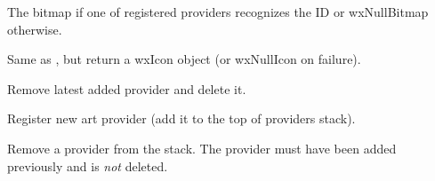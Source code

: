 The bitmap if one of registered providers recognizes the ID or wxNullBitmap otherwise.

\label{wxartprovidergeticon}


Same as , but
return a wxIcon object (or wxNullIcon on failure).

\label{wxartproviderctor}


Remove latest added provider and delete it.

\label{wxartproviderpushprovider}


Register new art provider (add it to the top of providers stack).

\label{wxartproviderremoveprovider}


Remove a provider from the stack. The provider must have been added previously
and is {\it not} deleted.

